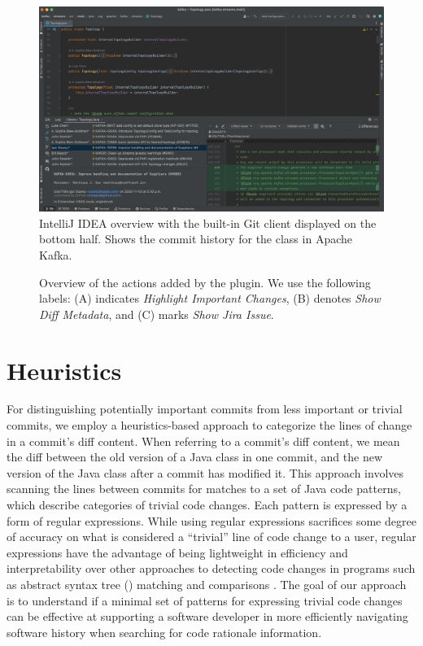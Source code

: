 \begin{figure}
    \includegraphics[width=\textwidth]{./images/intellij-overview.png}
    \caption{
        IntelliJ IDEA overview with the built-in Git client displayed on the bottom half. Shows the commit history for the  class in Apache Kafka.
    }
    \label{fig:IntelliJ-Overview}
\end{figure}

\begin{figure}
    \caption{
        Overview of the actions added by the  plugin. We use the following labels: (A) indicates \textit{Highlight Important Changes}, (B) denotes \textit{Show Diff Metadata}, and (C) marks \textit{Show Jira Issue}.
    }
    \label{fig:Intelligent-History-Overview}
\end{figure}

\section{Heuristics}
\label{sec:Heuristics}

For distinguishing potentially important commits from less important or trivial commits, we employ a heuristics-based approach to categorize the lines of change in a commit's diff content.
When referring to a commit's diff content, we mean the diff between the old version of a Java class in one commit, and the new version of the Java class after a commit has modified it.
This approach involves scanning the lines between commits for matches to a set of Java code patterns, which describe categories of trivial code changes.
Each pattern is expressed by a form of regular expressions.
While using regular expressions sacrifices some degree of accuracy on what is considered a ``trivial'' line of code change to a user,
regular expressions have the advantage of being lightweight in efficiency and interpretability over other approaches to detecting code changes in programs such as abstract syntax tree () matching and comparisons \cite{murphy_lightweight_1996}.
The goal of our approach is to understand if a minimal set of patterns for expressing trivial code changes can be effective at supporting a software developer in more efficiently navigating software history when searching for code rationale information.

